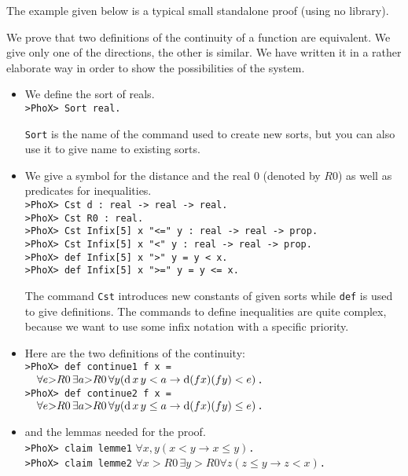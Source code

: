 The example given below is a typical small standalone proof (using no
library).

We prove that two definitions of the continuity of a function are
equivalent. We give only one of the directions, the other is
similar. We have written it in a rather elaborate way in order to show
the possibilities of the system.

\begin{itemize}
\item We define the sort of reals.  \\
\verb~>PhoX> Sort real.~

\verb~Sort~ is the name of the command used to create new sorts, but
you can also use it to give name to existing sorts.
 
\item We give a symbol for the distance and the real 0  (denoted by
$R0$) as well as predicates for inequalities.                         \\
\verb~>PhoX> Cst d : real -> real -> real.~                    \\
\verb~>PhoX> Cst R0 : real.~                                   \\
\verb~>PhoX> Cst Infix[5] x "<=" y : real -> real -> prop.~    \\
\verb~>PhoX> Cst Infix[5] x "<" y : real -> real -> prop.~     \\
\verb~>PhoX> def Infix[5] x ">" y = y < x.~                    \\
\verb~>PhoX> def Infix[5] x ">=" y = y <= x.~

The command \verb~Cst~ introduces new constants of given sorts while
\verb~def~ is used to give definitions. The commands to define
inequalities are quite
complex, because we want to use some infix notation with a specific
priority.

\item Here are the two definitions of the continuity:
\\\verb~>PhoX> def continue1 f x =~ \\\verb~  ~$\forall e{>}R0 \,\exists a{>}R0
\,\forall y
(\hbox{d}\,x\,y < a \rightarrow \hbox{d} (f x) (f y) < e)$\verb~.~                      \\
\verb~>PhoX> def continue2 f x =~ \\\verb~  ~$\forall e{>}R0 \,\exists a{>}R0
\,\forall y (\hbox{d}\,x\,y \leq a \rightarrow \hbox{d} (f x) (f
y) \leq e)$\verb~.~

\item and the lemmas needed for the proof. \\
\verb~>PhoX> claim lemme1~ $\forall x,y (x < y \rightarrow x \leq y)$\verb~.~ \\
\verb~>PhoX> claim lemme2~ $\forall x{>}R0 \,\exists y{>}R0 \forall z (z \leq y \rightarrow z < x)$\verb~.~


\end{itemize}
